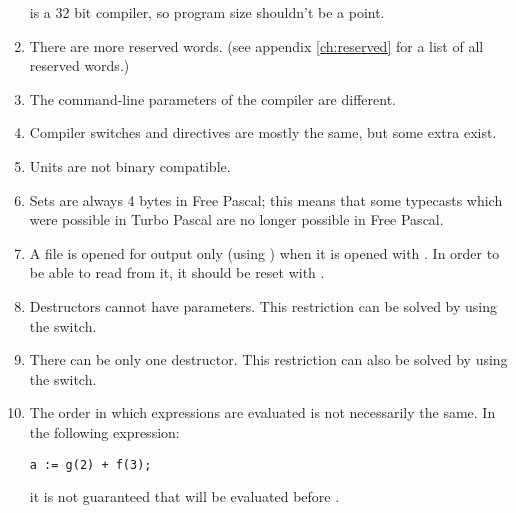 \documentclass{report}
\begin{document}
\begin{enumerate}
\fpc is a 32 bit compiler, so program size shouldn't be a point.
\item There are more reserved words. (see appendix \ref{ch:reserved} for a
list of all reserved words.)
\item The command-line parameters of the compiler are different.
\item Compiler switches and directives are mostly the same, but some extra
exist.
\item Units are not binary compatible.
\item Sets are always 4 bytes in Free Pascal; this means that some typecasts
which were possible in Turbo Pascal are no longer possible in Free Pascal.
\item A file is opened for output only (using ) when it is
opened with . In order to be able to read from it, it should
be reset with .
\item Destructors cannot have parameters. This restriction can be solved by 
using the  switch.
\item There can be only one destructor. This restriction can also be 
solved by using the  switch.
\item The order in which expressions are evaluated is not necessarily the
same. In the following expression:
\begin{verbatim}
a := g(2) + f(3);
\end{verbatim}
it is not guaranteed that  will be evaluated before .
\end{enumerate}

\end{document}
